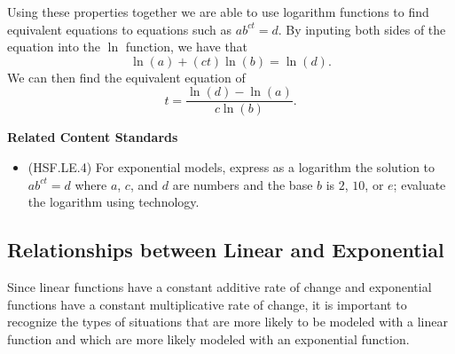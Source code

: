\documentclass[
]{book}
\providecommand{\tightlist}{%
  \setlength{\itemsep}{0pt}\setlength{\parskip}{0pt}}
\newenvironment{standards}{}{}
\theoremstyle{definition}
\theoremstyle{definition}
\theoremstyle{definition}
\theoremstyle{definition}
\theoremstyle{remark}
\begin{document}
Using these properties together we are able to use logarithm functions to find equivalent equations to equations such as \(a b^{ct}=d\). By inputing both sides of the equation into the \(\ln\) function, we have that
\[\ln(a) + (ct)\ln(b) = \ln (d).\] We can then find the equivalent equation of
\[t= \frac{\ln(d)-\ln(a)}{c\ln(b)}.\]

\begin{standards}

\begin{center}
\textbf{Related Content Standards}

\end{center}

\begin{itemize}
\tightlist
\item
  (HSF.LE.4) For exponential models, express as a logarithm the solution to \(a b^{ct}=d\) where \(a\), \(c\), and \(d\) are numbers and the base \(b\) is \(2\), \(10\), or \(e\); evaluate the logarithm using technology.\\
\end{itemize}

\end{standards}

\hypertarget{relationships-between-linear-and-exponential}{%
\subsection{Relationships between Linear and Exponential}\label{relationships-between-linear-and-exponential}}

Since linear functions have a constant additive rate of change and exponential functions have a constant multiplicative rate of change, it is important to recognize the types of situations that are more likely to be modeled with a linear function and which are more likely modeled with an exponential function.
\end{document}
